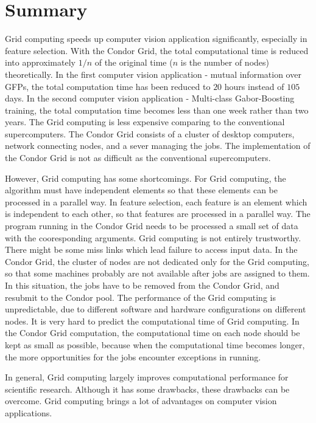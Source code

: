 \section{Summary}
Grid computing speeds up computer vision application significantly, especially in feature selection. With the Condor Grid, the total computational time is reduced into approximately $1/n$ of the original time ($n$ is the number of nodes) theoretically. In the first computer vision application - mutual information over GFPs, the total computation time has been reduced to $20$ hours instead of $105$ days. In the second computer vision application - Multi-class Gabor-Boosting training, the total computation time becomes less than one week rather than two years. The Grid computing is less expensive comparing to the conventional supercomputers. The Condor Grid consists of a cluster of desktop computers, network connecting nodes, and a sever managing the jobs. The implementation of the Condor Grid is not as difficult as the conventional supercomputers.

However, Grid computing has some shortcomings. For Grid computing, the algorithm must have independent elements so that these elements can be processed in a parallel way. In feature selection, each feature is an element which is independent to each other, so that features are processed in a parallel way. %
The program running in the Condor Grid needs to be processed a small set of data with the cooresponding arguments. Grid computing is not entirely trustworthy. There might be some miss links which lead failure to access input data. In the Condor Grid, the cluster of nodes are not dedicated only for the Grid computing, so that some machines probably are not available after jobs are assigned to them. In this situation, the jobs have to be removed from the Condor Grid, and resubmit to the Condor pool. The performance of the Grid computing is unpredictable, due to different software and hardware configurations on different nodes. It is very hard to predict the computational time of Grid computing. In the Condor Grid computation, the computational time on each node should be kept as small as possible, because when the computational time becomes longer, the more opportunities for the jobs encounter exceptions in running.

In general, Grid computing largely improves computational performance for scientific research. Although it has some drawbacks, these drawbacks can be overcome. Grid computing brings a lot of advantages on computer vision applications.